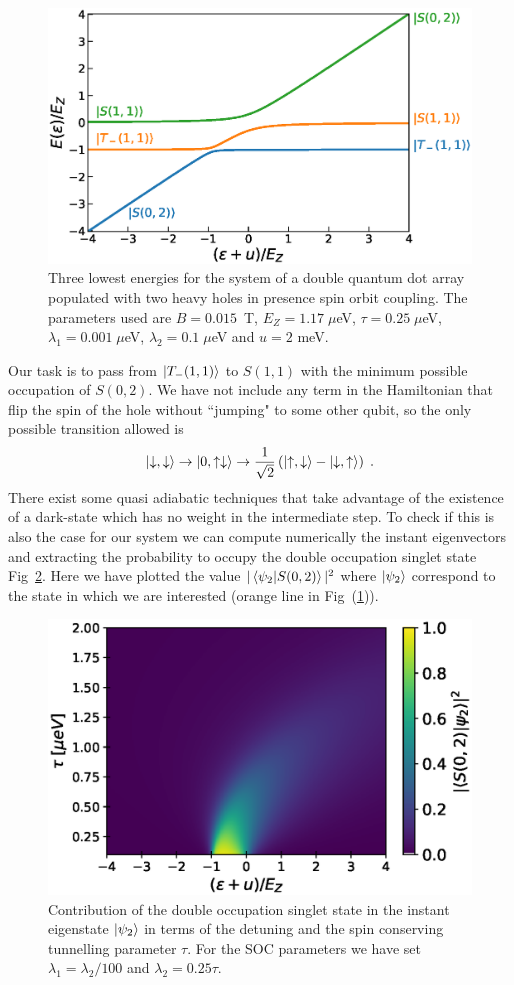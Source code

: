 \documentclass[a4paper,11pt]{article}
\begin{document}
\begin{figure}[!htbp]
	\centering
	\includegraphics[width=0.8\linewidth]{eigenenergies_2QD_2HH_w_SOC.eps}
	\caption{Three lowest energies for the system of a double quantum dot array populated with two heavy holes in presence spin orbit coupling. The parameters used are $B=0.015$~T, $E_Z=1.17\; \mu$eV, $\tau=0.25\; \mu$eV, $\lambda_1=0.001\; \mu$eV, $\lambda_2=0.1\; \mu$eV and $u=2$ meV.}
	\label{fig:eigenenergies_2QD_2HH_w_SOC}
\end{figure}
Our task is to pass from $\ket{T_-(1,1)}$ to $S(1,1)$ with the minimum possible occupation of $S(0,2)$. We have not include any term in the Hamiltonian that flip the spin of the hole without ``jumping" to some other qubit, so the only possible transition allowed is
\begin{equation}
	\ket{\downarrow,\downarrow}\rightarrow \ket{0,\uparrow\downarrow} \rightarrow \frac{1}{\sqrt{2}}\left(\ket{\uparrow,\downarrow}-\ket{\downarrow,\uparrow}\right)\; .
\end{equation}
There exist some quasi adiabatic techniques that take advantage of the existence of a dark-state which has no weight in the intermediate step. To check if this is also the case for our system we can compute numerically the instant eigenvectors and extracting the probability to occupy the double occupation singlet state Fig~\ref{fig:occupation_middle_state}. Here we have plotted the value $|\braket{\psi_2}{S(0,2)}|^2$ where $\ket{\psi_2}$ correspond to the state in which we are interested (orange line in Fig~(\ref{fig:eigenenergies_2QD_2HH_w_SOC})).
\begin{figure}[!htbp]
	\centering
	\includegraphics[width=0.6\linewidth]{occupation_middle_state.eps}
	\caption{Contribution of the double occupation singlet state in the instant eigenstate $\ket{\psi_2}$ in terms of the detuning and the spin conserving tunnelling parameter $\tau$. For the SOC parameters we have set $\lambda_1=\lambda_2/100$ and $\lambda_2=0.25\tau$.}
	\label{fig:occupation_middle_state}
\end{figure}
\end{document}
